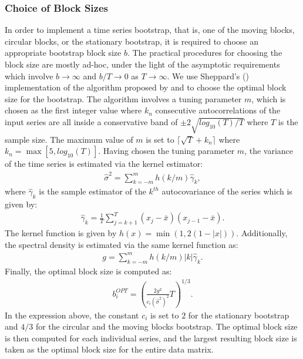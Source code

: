 \documentclass{article} %
\begin{document}
	\subsubsection{Choice of Block Sizes}
	In order to implement a time series bootstrap, that is, one of the moving blocks, circular blocks, or the stationary bootstrap, it is required to choose an appropriate bootstrap block size $b$. The practical procedures for choosing the block size are mostly ad-hoc, under the light of the asymptotic requirements which involve $b \to \infty$ and $b/T \to 0$ as $T \to \infty$. We use Sheppard's (\textcite{SHEPPARCH}) implementation of the algorithm proposed by \textcite{POLITISWHITE2004} and \textcite{PATTONPOLITIS2009} to choose the optimal block size for the bootstrap. The algorithm involves a tuning parameter $m$, which is chosen as the first integer value where $k_n$ consecutive autocorrelations of the input series are all inside a conservative band of $\pm 2 \sqrt{log_{10}(T)/T}$ where $T$ is the sample size. The maximum value of $m$ is set to $\lceil \sqrt{T} + k_n \rceil$ where $k_n = \max[5, log_{10}(T)]$. Having chosen the tuning parameter $m$, the variance of the time series is estimated via the kernel estimator:
	\begin{align}
		\hat{\sigma}^2 = \sum_{k=-m}^{m} h(k/m) \hat{\gamma}_k,
	\end{align}
	where $\hat{\gamma}_k$ is the sample estimator of the $k^{th}$ autocovariance of the series which is given by:
	\begin{align}
		\hat{\gamma}_k = \frac{1}{T} \sum_{j=k+1}^T (x_j - \bar{x}) (x_{j-1} - \bar{x}).
	\end{align}
	The kernel function is given by $h(x) = \min(1, 2 (1 - |x|))$. Additionally, the spectral density is estimated via the same kernel function as:
	\begin{align}
		g = \sum_{k=-m}^m h(k/m) |k| \hat{\gamma}_k.
	\end{align}
	Finally, the optimal block size is computed as:
	\begin{align}
		b_i^{OPT} = \left( \frac{ 2 g^2 }{ c_i (\hat{\sigma}^2)^2 } T \right)^{1/3}.
	\end{align}
	In the expression above, the constant $c_i$ is set to $2$ for the stationary bootstrap and $4/3$ for the circular and the moving blocks bootstrap. The optimal block size is then computed for each individual series, and the largest resulting block size is taken as the optimal block size for the entire data matrix.
\end{document}
